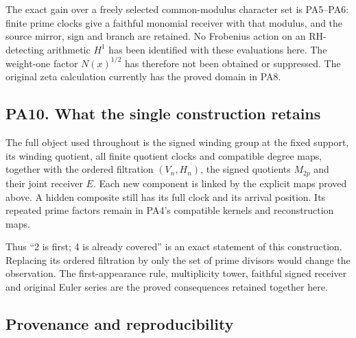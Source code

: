 The exact gain over a freely selected common-modulus character set is PA5--PA6: finite prime clocks give a faithful monomial receiver with that modulus, and the source mirror, sign and branch are retained. No Frobenius action on an RH-detecting arithmetic \(H^1\) has been identified with these evaluations here. The weight-one factor \(N(x)^{1/2}\) has therefore not been obtained or suppressed. The original zeta calculation currently has the proved domain in PA8.

\subsection{PA10. What the single construction retains}\label{pa20260924-pa10.-what-the-single-construction-retains}

The full object used throughout is the signed winding group at the fixed support, its winding quotient, all finite quotient clocks and compatible degree maps, together with the ordered filtration \((V_n,H_n)\), the signed quotients \(M_{2p}\) and their joint receiver \(E\). Each new component is linked by the explicit maps proved above. A hidden composite still has its full clock and its arrival position. Its repeated prime factors remain in PA4's compatible kernels and reconstruction maps.

Thus ``2 is first; 4 is already covered'' is an exact statement of this construction. Replacing its ordered filtration by only the set of prime divisors would change the observation. The first-appearance rule, multiplicity tower, faithful signed receiver and original Euler series are the proved consequences retained together here.

\subsection{Provenance and reproducibility}\label{pa20260924-provenance-and-reproducibility}

